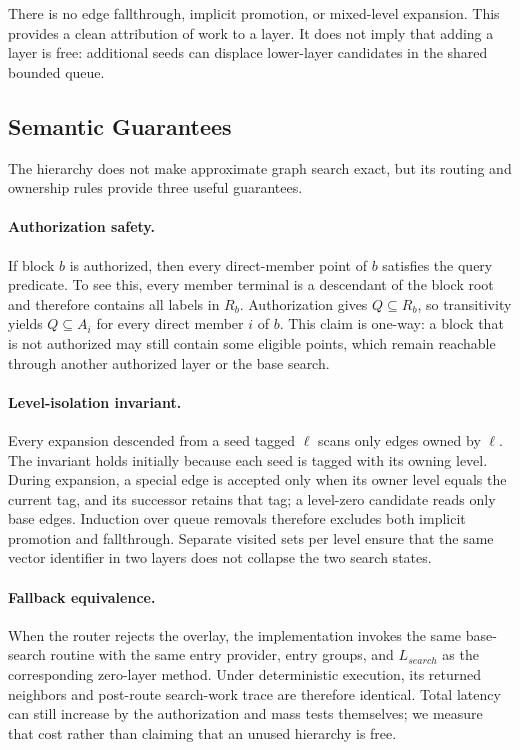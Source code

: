 \documentclass[sigconf,review,anonymous]{acmart}
\begin{document}
There is no edge fallthrough, implicit promotion, or mixed-level expansion.
This provides a clean attribution of work to a layer.  It does not imply that
adding a layer is free: additional seeds can displace lower-layer candidates in
the shared bounded queue.

\subsection{Semantic Guarantees}
The hierarchy does not make approximate graph search exact, but its routing
and ownership rules provide three useful guarantees.

\paragraph{Authorization safety.}
If block $b$ is authorized, then every direct-member point of $b$ satisfies the
query predicate.  To see this, every member terminal is a descendant of the
block root and therefore contains all labels in $R_b$.  Authorization gives
$Q\subseteq R_b$, so transitivity yields $Q\subseteq A_i$ for every direct
member $i$ of $b$.  This claim is one-way: a block that is not authorized may
still contain some eligible points, which remain reachable through another
authorized layer or the base search.

\paragraph{Level-isolation invariant.}
Every expansion descended from a seed tagged $\ell$ scans only edges owned by
$\ell$.  The invariant holds initially because each seed is tagged with its
owning level.  During expansion, a special edge is accepted only when its owner
level equals the current tag, and its successor retains that tag; a level-zero
candidate reads only base edges.  Induction over queue removals therefore
excludes both implicit promotion and fallthrough.  Separate visited sets per
level ensure that the same vector identifier in two layers does not collapse
the two search states.

\paragraph{Fallback equivalence.}
When the router rejects the overlay, the implementation invokes the same
base-search routine with the same entry provider, entry groups, and
$L_{search}$ as the corresponding zero-layer method. Under deterministic
execution, its returned neighbors and post-route search-work trace are
therefore identical. Total latency can still increase by the authorization
and mass tests themselves; we measure that cost rather than claiming that an
unused hierarchy is free.
\end{document}
